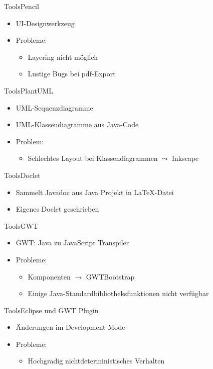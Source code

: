 \documentclass[10pt]{beamer}
\begin{document}
\begin{frame}{Tools}{Pencil}
	\begin{itemize}
		\item UI-Designwerkzeug
		\item Probleme:
			\begin{itemize}
				\item Layering nicht möglich
				\item Lustige Bugs bei pdf-Export
			\end{itemize} 
	\end{itemize}
\end{frame}

\begin{frame}{Tools}{PlantUML}
	\begin{itemize}
		\item UML-Sequenzdiagramme
		\item UML-Klassendiagramme aus Java-Code
		\item Problem: 
			\begin{itemize}
				\item Schlechtes Layout bei Klassendiagrammen $\leadsto$ Inkscape
			\end{itemize}
	\end{itemize}
\end{frame}

\begin{frame}{Tools}{Doclet}
	\begin{itemize}
		\item Sammelt Javadoc aus Java Projekt in \LaTeX{}-Datei
		\item Eigenes Doclet geschrieben
	\end{itemize}
\end{frame}

\begin{frame}{Tools}{GWT}
	\begin{itemize}
		\item GWT: Java zu JavaScript Transpiler 
		\item Probleme: 
		\begin{itemize}
			\item Komponenten $\rightarrow$ GWTBootstrap
			\item Einige Java-Standardbibliotheksfunktionen nicht verfügbar
		\end{itemize}
	\end{itemize}
\end{frame}

\begin{frame}{Tools}{Eclipse und GWT Plugin}
	\begin{itemize}
		\item Änderungen im Development Mode  
		\item Probleme:
		\begin{itemize}
			\item Hochgradig nichtdeterministisches Verhalten
		\end{itemize}
	\end{itemize}
\end{frame}
\end{document}
